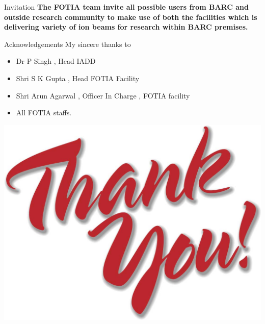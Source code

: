 \documentclass[11pt]{beamer}
\begin{document}
\begin{frame}{Invitation}
 \textbf{The FOTIA team invite all possible users from BARC and outside research community to make use of both the facilities which is delivering variety of ion beams for research within BARC premises.}\\
 
 
\end{frame}

\begin{frame}{Acknowledgements}
 My sincere thanks to 
 
 
 \begin{center}
  \begin{itemize}
  \item Dr P Singh , Head IADD
  \item Shri S K Gupta , Head FOTIA Facility
  \item Shri Arun Agarwal , Officer In Charge , FOTIA facility
  \item All FOTIA staffs.
  \end{itemize}
\end{center}
\end{frame}

\begin{frame}
\begin{center}
  \includegraphics[scale=0.2]{thank_you.jpg}
  
\end{center}
\end{frame}
\end{document}
